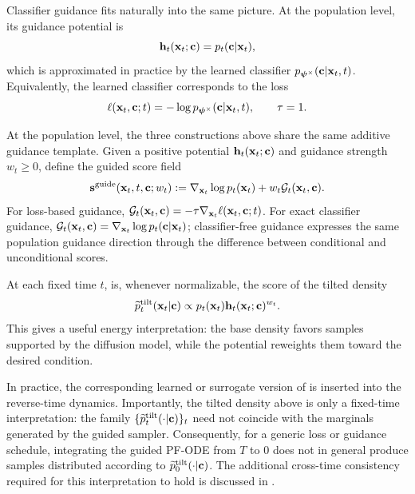 \begin{enumerate}[leftmargin=*]
Classifier guidance fits naturally into the same picture. At the population
level, its guidance potential is
\[
{\mathbf{h}}_t({\mathbf{x}}_t;{\mathbf{c}})
=
p_t({\mathbf{c}}|{\mathbf{x}}_t),
\]
which is approximated in practice by the learned classifier
$p_{{\bm{\psi}}^\times}({\mathbf{c}}|{\mathbf{x}}_t,t)$. Equivalently, the learned classifier
corresponds to the loss
\[
\ell({\mathbf{x}}_t,{\mathbf{c}};t)
=
-\log p_{{\bm{\psi}}^\times}({\mathbf{c}}|{\mathbf{x}}_t,t),
\qquad \tau=1.
\]


\end{enumerate}

At the population level, the three constructions above share the same additive
guidance template. Given a positive potential
${\mathbf{h}}_t({\mathbf{x}}_t;{\mathbf{c}})$ and guidance strength $w_t\geq0$, define the guided score
field
\begin{align}
{\mathbf{s}}^{\mathrm{guide}}({\mathbf{x}}_t,t,{\mathbf{c}};w_t)
:=
\nabla_{{\mathbf{x}}_t}\log p_t({\mathbf{x}}_t)
+
w_t\mathcal{G}_t({\mathbf{x}}_t,{\mathbf{c}}).
\label{eq:generic-guided-score}
\end{align}
For loss-based guidance,
$\mathcal{G}_t({\mathbf{x}}_t,{\mathbf{c}})
=-\tau\nabla_{{\mathbf{x}}_t}\ell({\mathbf{x}}_t,{\mathbf{c}};t)$.
For exact classifier guidance,
$\mathcal{G}_t({\mathbf{x}}_t,{\mathbf{c}})
=\nabla_{{\mathbf{x}}_t}\log p_t({\mathbf{c}}|{\mathbf{x}}_t)$; classifier-free guidance expresses
the same population guidance direction through the difference between
conditional and unconditional scores.

At each fixed time $t$,  is, whenever
normalizable, the score of the tilted density
\[
\widetilde p_t^{\mathrm{tilt}}({\mathbf{x}}_t|{\mathbf{c}})
\propto
p_t({\mathbf{x}}_t){\mathbf{h}}_t({\mathbf{x}}_t;{\mathbf{c}})^{w_t}.
\]
This gives a useful energy interpretation: the base density favors samples
supported by the diffusion model, while the potential reweights them toward
the desired condition.

In practice, the corresponding learned or surrogate version of
 is inserted into the reverse-time dynamics.
Importantly, the tilted density above is only a fixed-time interpretation:
the family
$\{\widetilde p_t^{\mathrm{tilt}}(\cdot|{\mathbf{c}})\}_t$
need not coincide with the marginals generated by the guided sampler.
Consequently, for a generic loss or guidance schedule, integrating the guided
PF-ODE from $T$ to $0$ does not in general produce samples distributed
according to $\widetilde p_0^{\mathrm{tilt}}(\cdot|{\mathbf{c}})$.
The additional cross-time consistency required for this interpretation to hold
is discussed in .


